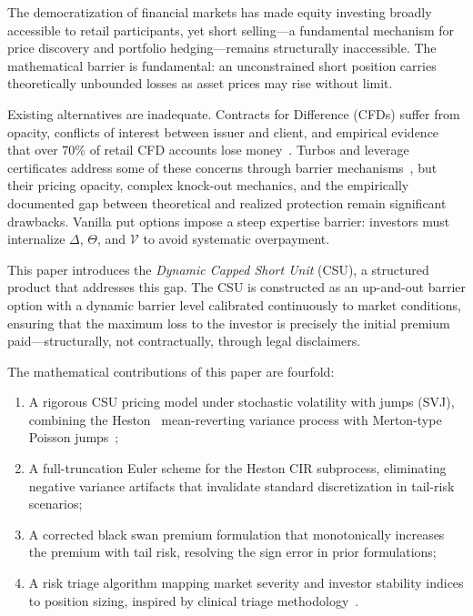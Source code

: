 \documentclass[12pt]{article}
\begin{document}
The democratization of financial markets has made equity investing broadly accessible to retail
participants, yet short selling---a fundamental mechanism for price discovery and portfolio
hedging---remains structurally inaccessible. The mathematical barrier is fundamental: an
unconstrained short position carries theoretically unbounded losses as asset prices may rise
without limit.

Existing alternatives are inadequate. Contracts for Difference (CFDs) suffer from opacity,
conflicts of interest between issuer and client, and empirical evidence that over 70\% of retail
CFD accounts lose money~\cite{entrop2009price}. Turbos and leverage certificates address some of
these concerns through barrier mechanisms~\cite{zhang2017gap}, but their pricing opacity, complex
knock-out mechanics, and the empirically documented gap between theoretical and realized protection
remain significant drawbacks. Vanilla put options impose a steep expertise barrier: investors must
internalize $\Delta$, $\Theta$, and $\mathcal{V}$ to avoid systematic overpayment.

This paper introduces the \emph{Dynamic Capped Short Unit} (CSU), a structured product that
addresses this gap. The CSU is constructed as an up-and-out barrier option with a dynamic barrier
level calibrated continuously to market conditions, ensuring that the maximum loss to the investor
is precisely the initial premium paid---structurally, not contractually, through legal disclaimers.

The mathematical contributions of this paper are fourfold:
\begin{enumerate}
    \item A rigorous CSU pricing model under stochastic volatility with jumps (SVJ), combining
          the Heston~\cite{heston1993closed} mean-reverting variance process with Merton-type
          Poisson jumps~\cite{merton1976option};
    \item A full-truncation Euler scheme for the Heston CIR subprocess, eliminating negative
          variance artifacts that invalidate standard discretization in tail-risk scenarios;
    \item A corrected black swan premium formulation that monotonically increases the
          premium with tail risk, resolving the sign error in prior formulations;
    \item A risk triage algorithm mapping market severity and investor stability indices to
          position sizing, inspired by clinical triage methodology~\cite{grossman2019triage}.
\end{enumerate}
\end{document}
